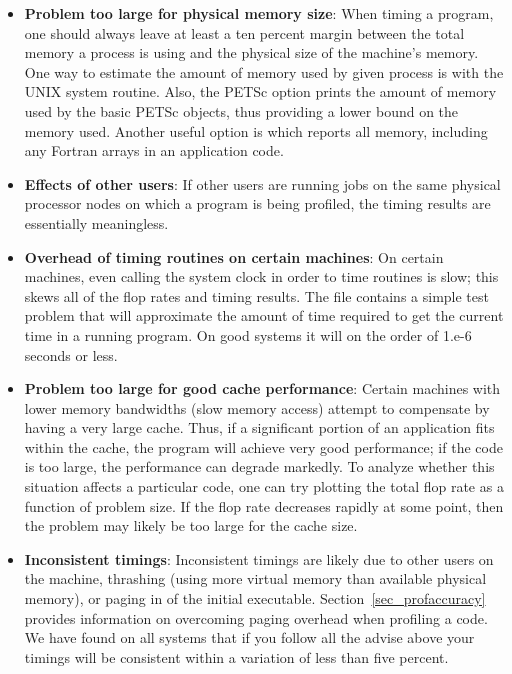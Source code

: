 {{\begin{itemize}
\item {\bf Problem too large for physical memory size}: When timing a program, one
      should always leave at least a ten percent margin between the total
      memory a process is using and the physical size of
      the machine's memory. One way to estimate the amount of
      memory used by given process is with the UNIX  system routine.
      Also, the PETSc option  prints the amount of
      memory used by the basic PETSc objects, thus providing a lower
      bound on the memory used.  Another useful option is 
      which reports all memory, including any Fortran arrays in an
      application code.
\item {\bf Effects of other users}:  If other users are running
      jobs on the same physical processor nodes on which a program is being profiled,
      the timing results are essentially meaningless.
\item {\bf Overhead of timing routines on certain machines}: On certain machines,
      even calling the system clock in order to time routines is
      slow; this skews all of the flop rates and timing results. The file
       contains a
      simple test problem that will approximate the amount of time
      required to get the current time in a running program. On good
      systems it will on the order of 1.e-6 seconds or less.
\item {\bf Problem too large for good cache performance}: Certain machines
      with lower memory bandwidths (slow memory access) attempt to
      compensate by having a very large cache.  Thus, if a significant
      portion of an application fits within the cache, the program will achieve very
      good performance; if the code is too large, the performance can degrade markedly.
      To analyze whether this situation affects a particular code, one can
      try plotting the total flop rate as a function of problem
      size.  If the flop rate decreases rapidly at some point, then the
      problem may likely be too large for the cache size.
\item {\bf Inconsistent timings}:  Inconsistent timings are likely due to other
      users on the machine, thrashing (using more virtual memory than available
      physical memory), or paging in of the initial executable.
      Section~\ref{sec_profaccuracy} provides information on overcoming paging
      overhead when profiling a code. We have found on all systems that if you
      follow all the advise above your timings will be consistent within a variation
      of less than five percent.
\end{itemize}

}}
